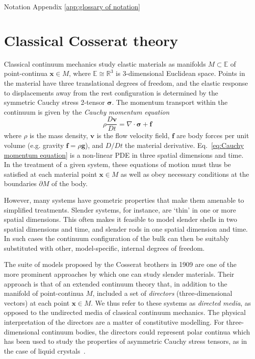 Notation Appendix \ref{app:glossary of notation}


\section{Classical Cosserat theory} \label{sec:Classical Cosserat theory}

Classical continuum mechanics study elastic materials as manifolds $M \subset \mathbb{E}$ of point-continua $\mathbf{x} \in M$, where $\mathbb{E} \cong \mathbb{R}^3$ is 3-dimensional Euclidean space. Points in the material have three translational degrees of freedom, and the elastic response to displacements away from the rest configuration is determined by the symmetric Cauchy stress 2-tensor $\boldsymbol{\sigma}$. The momentum transport within the continuum is given by the \textit{Cauchy momentum equation}
\begin{equation} \label{eq:Cauchy momentum equation}
\rho \frac{D \mathbf{v} }{D t} = \nabla \cdot \boldsymbol{\sigma} + \mathbf{f}
\end{equation}
where $\rho$ is the mass density, $\mathbf{v}$ is the flow velocity field, $\mathbf{f}$ are body forces per unit volume (e.g. gravity $\mathbf{f} = \rho \mathbf{g}$), and $D/Dt$ the material derivative. Eq.~\eqref{eq:Cauchy momentum equation} is a non-linear PDE in three spatial dimensions and time. In the treatment of a given system, these equations of motion must thus be satisfied at each material point $\mathbf{x} \in M$ as well as obey necessary conditions at the boundaries $\partial M$ of the body.

However, many systems have geometric properties that make them amenable to simplified treatments. Slender systems, for instance, are `thin' in one or more spatial dimensions. This often makes it feasible to model slender shells in two spatial dimensions and time, and slender rods in one spatial dimension and time. In such cases the continuum configuration of the bulk can then be suitably substituted with other, model-specific, internal degrees of freedom.

The suite of models proposed by the Cosserat brothers \citep{cosseratTheoryDeformableBodies1909} in 1909 are one of the more prominent approaches by which one can study slender materials. Their approach is that of an extended continuum theory that, in addition to the manifold of point-continua $M$, included a set of \textit{directors} (three-dimensional vectors) at each point $\mathbf{x} \in M$. We thus refer to these systems as \textit{directed media}, as opposed to the undirected media of classical continuum mechanics. The physical interpretation of the directors are a matter of constitutive modelling. For three-dimensional continuum bodies, the directors could represent polar continua which has been used to study the properties of asymmetric Cauchy stress tensors, as in the case of liquid crystals~\citep{ericksenConservationLawsLiquid1961}.

